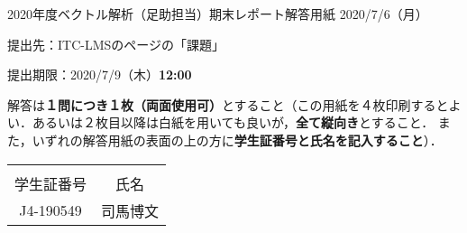 \documentclass[dvipdfmx,a4paper,uplatex]{jsarticle}
\newcommand\GAKUSEISHOBANGO{J4-190549}%
\newcommand\NAMAE{司馬博文}%
\begin{document}
\thispagestyle{empty}
\setlength{\parindent}{1zw}
\setlength{\baselineskip}{13pt}
\setcounter{section}{9}
\setcounter{version}{1}
\noindent
2020年度ベクトル解析（足助担当）期末レポート解答用紙%
\hfil2020/7/6（月）\par\noindent
提出先：ITC-LMSのページの「課題」\par\noindent
提出期限：2020/7/9（木）\textbf{12:00}\par\noindent
解答は\textbf{１問につき１枚（両面使用可）}とすること（この用紙を４枚印刷するとよい．あるいは２枚目以降は白紙を用いても良いが，\textbf{全て縦向き}とすること．
また，いずれの解答用紙の表面の上の方に\textbf{学生証番号と氏名を記入すること}）．
\vskip-18pt\noindent
\begin{table}[h]
\begin{tabular}{|c|c|} \hline
& \\[-13pt]
学生証番号& 氏名 \\[2pt] \hline
\rule{0pt}{16pt}%
\parbox[c]{9.2zw}{\GAKUSEISHOBANGO\hfill} & \parbox[c]{13.0zw}{\NAMAE\hfill} \\[6pt] \hline
\end{tabular}
\end{table}
\end{document}
